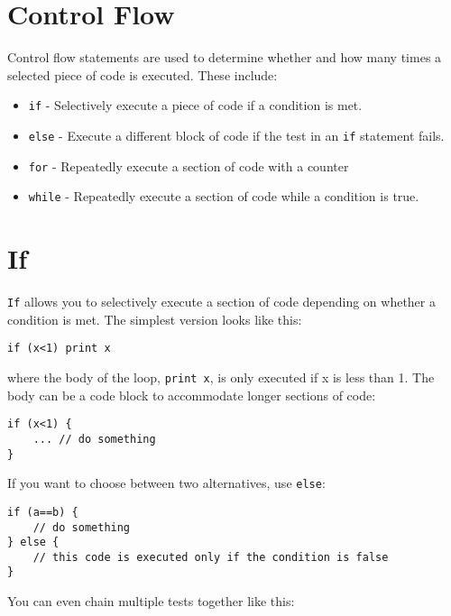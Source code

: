 \hypertarget{control-flow}{%
\section{Control Flow}\label{control-flow}}

Control flow statements are used to determine whether and how many times
a selected piece of code is executed. These include:

\begin{itemize}

\item
  \texttt{if} - Selectively execute a piece of code if a condition is
  met.
\item
  \texttt{else} - Execute a different block of code if the test in an
  \texttt{if} statement fails.
\item
  \texttt{for} - Repeatedly execute a section of code with a counter
\item
  \texttt{while} - Repeatedly execute a section of code while a
  condition is true.
\end{itemize}

\hypertarget{if}{%
\section{If}\label{if}}

\texttt{If} allows you to selectively execute a section of code
depending on whether a condition is met. The simplest version looks like
this:

\begin{lstlisting}
if (x<1) print x
\end{lstlisting}

where the body of the loop, \texttt{print\ x}, is only executed if x is
less than 1. The body can be a code block to accommodate longer sections
of code:

\begin{lstlisting}
if (x<1) {
    ... // do something
}
\end{lstlisting}

If you want to choose between two alternatives, use \texttt{else}:

\begin{lstlisting}
if (a==b) {
    // do something
} else {
    // this code is executed only if the condition is false
}
\end{lstlisting}

You can even chain multiple tests together like this:

